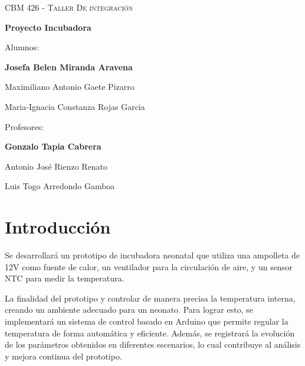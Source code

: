 \documentclass[spanish, a4paper, 11pt]{article}
\begin{document}
\thispagestyle{unicamp}

\begin{center}

	\null\vfill

	{\scshape\large CBM 426 - Taller De integración\par}

	\baselineskip

	{\LARGE\bfseries Proyecto Incubadora\par}

	\baselineskip

	Alumnos:\\[1ex]
	{\large\bfseries Josefa Belen Miranda Aravena

	Maximiliano Antonio Gaete Pizarro

	Maria-Ignacia Constanza Rojas Garcia \par}

	\baselineskip

	Profesores:\\[1ex]
	{\large\bfseries Gonzalo Tapia Cabrera

	Antonio José Rienzo Renato

	Luis Togo Arredondo Gamboa\par}

\end{center}

\vfill




\newpage

\onehalfspacing

\tableofcontents

\newpage

\section{Introducción}

Se desarrollará un prototipo de incubadora neonatal que utiliza una ampolleta de 12V como fuente de calor, un ventilador para la circulación de aire, y un sensor NTC para medir la temperatura. 

La finalidad del prototipo y controlar de manera precisa la temperatura interna, creando un ambiente adecuado para un neonato. Para lograr esto, se implementará un sistema de control basado en Arduino que permite regular la temperatura de forma automática y eficiente. Además, se registrará la evolución de los parámetros obtenidos en diferentes escenarios, lo cual contribuye al análisis y mejora continua del prototipo.\par
\end{document}
